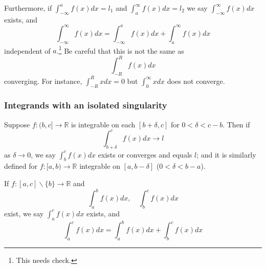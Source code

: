 \documentclass[10pt, a4paper, twoside]{report}
\begin{document}
Furthermore, if \(\int_{-\infty}^a f(x)dx=l_1\) and \(\int_a^\infty f(x)dx=l_2\) we say \(\int_{-\infty}^\infty f(x)dx\) exists, and 
\[\int_{-\infty}^\infty f(x)dx=\int_{-\infty}^a f(x)dx+\int_a^\infty f(x)dx\]
independent of \(a\).\footnote{This needs check.} Be careful that this is not the same as 
\[\int_{-R}^Rf(x)dx\]
converging. For instance, \(\int_{-R}^Rxdx=0\) but \(\int_0^\infty xdx\) does not converge.
\subsubsection{Integrands with an isolated singularity}
Suppose \(f:(b,c]\to\mathbb{R}\) is integrable on each \([b+\delta,c]\) for \(0<\delta<c-b\). Then if 
\[\int_{b+\delta}^cf(x)dx\to l\]
as \(\delta\to 0\), we say \(\int_b^cf(x)dx\) exists or converges and equals \(l\); and it is similarly defined for \(f:[a,b)\to\mathbb{R}\) integrable on \([a,b-\delta]\) (\(0<\delta<b-a\)).

If \(f:[a,c]\backslash\{b\}\to\mathbb{R}\) and 
\[\int_a^bf(x)dx,\quad\int_b^cf(x)dx\]
exist, we say \(\int_a^cf(x)dx\) exists, and 
\[\int_a^cf(x)dx=\int_a^bf(x)dx+\int_b^cf(x)dx\]
\end{document}
